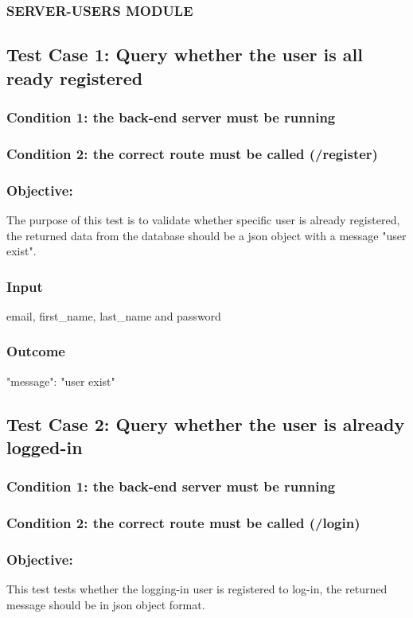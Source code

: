 \subsubsection*{SERVER-USERS MODULE}
\subsection{Test Case 1: Query whether the user is all ready registered }
\subsubsection{Condition 1: the back-end server must be running}
\subsubsection{Condition 2: the correct route must be called (/register)}
\subsubsection{Objective:} The purpose of this test is to validate whether specific user is already registered, the returned data from the database should be a json object with a message "user exist".
\subsubsection{Input}
{email, first\_name, last\_name and password}
\subsubsection{Outcome}
{"message": "user exist"}

\subsection{Test Case 2: Query whether the user is already logged-in}

\subsubsection{Condition 1: the back-end server must be running}
\subsubsection{Condition 2: the correct route must be called (/login)}
\subsubsection{Objective: } This test tests whether the logging-in user is registered to log-in, the returned message should be in json object format.
